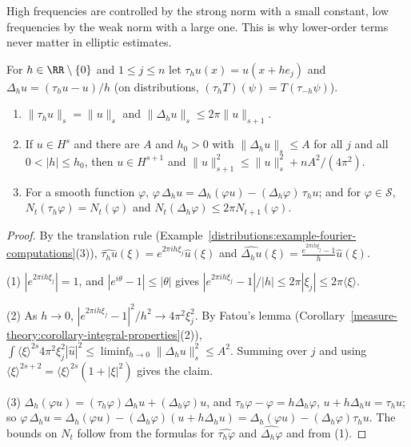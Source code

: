 High frequencies are controlled by the strong norm with a small constant, low frequencies by the weak norm with a large one. This is why lower-order terms never matter in elliptic estimates.

\begin{lemma}\label{distributions:lemma-difference-quotients}
For $h \in \RR \setminus \{0\}$ and $1 \leq j \leq n$ let $\tau_hu(x) = u(x + he_j)$ and $\Delta_hu = (\tau_hu - u)/h$ (on distributions, $(\tau_hT)(\psi) = T(\tau_{-h}\psi)$).
\begin{enumerate}
\item $\|\tau_hu\|_s = \|u\|_s$ and $\|\Delta_hu\|_s \leq 2\pi\|u\|_{s+1}$.
\item If $u \in H^s$ and there are $A$ and $h_0 > 0$ with $\|\Delta_hu\|_s \leq A$ for all $j$ and all $0 < |h| \leq h_0$, then $u \in H^{s+1}$ and $\|u\|_{s+1}^2 \leq \|u\|_s^2 + nA^2/(4\pi^2)$.
\item For a smooth function $\varphi$, $\varphi\,\Delta_hu = \Delta_h(\varphi u) - (\Delta_h\varphi)\,\tau_hu$; and for $\varphi \in \mathcal{S}$, $N_t(\tau_h\varphi) = N_t(\varphi)$ and $N_t(\Delta_h\varphi) \leq 2\pi N_{t+1}(\varphi)$.
\end{enumerate}
\end{lemma}

\begin{proof}
By the translation rule (Example~\ref{distributions:example-fourier-computations}(3)), $\widehat{\tau_hu}(\xi) = e^{2\pi ih\xi_j}\hat u(\xi)$ and $\widehat{\Delta_hu}(\xi) = \frac{e^{2\pi ih\xi_j} - 1}{h}\hat u(\xi)$.

(1) $|e^{2\pi ih\xi_j}| = 1$, and $|e^{i\theta} - 1| \leq |\theta|$ gives $|e^{2\pi ih\xi_j} - 1|/|h| \leq 2\pi|\xi_j| \leq 2\pi\langle\xi\rangle$.

(2) As $h \to 0$, $|e^{2\pi ih\xi_j} - 1|^2/h^2 \to 4\pi^2\xi_j^2$. By Fatou's lemma (Corollary~\ref{measure-theory:corollary-integral-properties}(2)),
$\int\langle\xi\rangle^{2s}4\pi^2\xi_j^2|\hat u|^2 \leq \liminf_{h \to 0}\|\Delta_hu\|_s^2 \leq A^2$. Summing over $j$ and using $\langle\xi\rangle^{2s+2} = \langle\xi\rangle^{2s}(1 + |\xi|^2)$ gives the claim.

(3) $\Delta_h(\varphi u) = (\tau_h\varphi)\Delta_hu + (\Delta_h\varphi)u$, and $\tau_h\varphi - \varphi = h\Delta_h\varphi$, $u + h\Delta_hu = \tau_hu$; so
$\varphi\,\Delta_hu = \Delta_h(\varphi u) - (\Delta_h\varphi)(u + h\Delta_hu) = \Delta_h(\varphi u) - (\Delta_h\varphi)\tau_hu$. The bounds on $N_t$ follow from the formulas for $\widehat{\tau_h\varphi}$ and $\widehat{\Delta_h\varphi}$ and from (1).
\end{proof}

